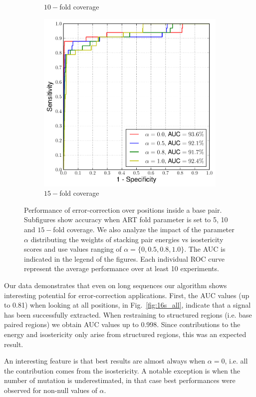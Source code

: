 \begin{figure}
\begin{subfigure}{.33\textwidth}
    \caption{$10-$fold coverage}
\end{subfigure}
\begin{subfigure}{.33\textwidth}
  \centering
  \includegraphics[width=\linewidth]{figures/15fold-b}
    \caption{$15-$fold coverage}
\end{subfigure}
\caption{Performance of error-correction over positions inside a base pair. Subfigures show accuracy when
ART fold parameter is set to 5, 10 and $15-$fold coverage. We also analyze the impact of the parameter $\alpha$ distributing the weights of stacking pair energies vs isostericity scores and use values ranging of $\alpha = \{0, 0.5, 0.8, 1.0\}$. The AUC is indicated in the legend of the figures. Each individual ROC curve represent the average performance over at least 10 experiments.}
\label{fig:16s_bp}
\end{figure}

Our data demonstrates that even on long sequences our algorithm shows interesting potential for 
error-correction applications. First, the AUC values (up to 0.81) when looking at all positions, 
in Fig.~\ref{fig:16s_all},  indicate that a signal has been successfully extracted. When restraining
to structured regions (i.e. base paired regions) we obtain AUC values up to 0.998.  Since 
contributions to the energy and isostericity only arise from structured regions, this was an expected result.

An interesting feature is that best results are almost always when $\alpha=0$, i.e. all the contribution
comes from the isostericity. A notable exception is when the number of mutation is underestimated, 
in that case best performances were observed for non-null values of $\alpha$.

